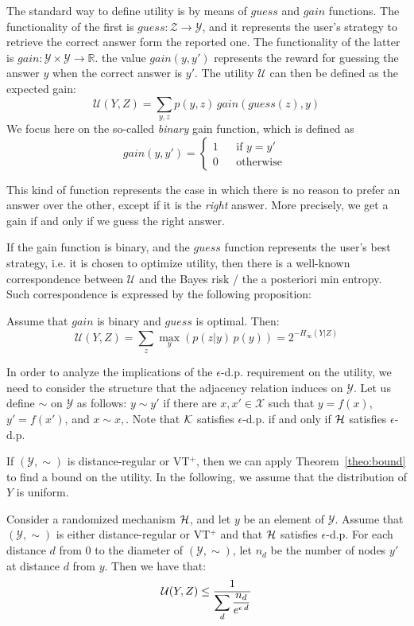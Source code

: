 \documentclass{llncs}
\newcommand{\calx}{\mathcal{X}}
\newcommand{\caly}{\mathcal{Y}}
\newcommand{\calz}{\mathcal{Z}}
\newcommand{\calu}{\mathcal{U}}
\begin{document}
The standard way to define utility  is by means of $\mathit{guess}$ and $\mathit{gain}$ functions. The functionality of the first is 
$\mathit{guess}:\calz\rightarrow \caly$, and it represents the user's strategy to retrieve the correct answer form the reported one. The functionality of the latter is $\mathit{gain}:\caly\times\caly\rightarrow \mathbb{R}$. the value $\mathit{gain}(y,y')$ represents  the reward for guessing the answer $y$ when the correct answer is $y'$. 
The utility $\calu$ can then be defined as the expected gain: 
\[
\calu(Y,Z) = \sum_{y,z} p(y,z)\,\mathit{gain}(\mathit{guess}(z),y)
\]
We focus here on the so-called  \emph{binary} gain function, which is defined as
\[
\mathit{gain}(y,y') = \left\{\begin{array}{lll} 
					1 && \mbox{if } y = y'\\[1mm]
					0 && \mbox{otherwise }
				\end{array}
				\right.
\]

This kind of function represents the case in which there is no reason to prefer an answer over the other, except if it is the \emph{right} answer. More precisely,  we get a gain if and only if we guess the right answer. 

If the gain function is binary, and the $\mathit{guess}$ function represents the user's best strategy, i.e. it is chosen to optimize  utility, then there is a well-known correspondence between  $\calu$ and the Bayes risk / the a posteriori min entropy. Such correspondence   is  expressed by the following proposition:

\begin{proposition}
Assume that $\mathit{gain}$ is binary and  $\mathit {guess}$ is optimal. Then:
\[\calu(Y,Z) = \sum_{z} \max_y (p(z|y) \, p(y)) = 2^{-H_\infty(Y|Z)}\]
\end{proposition}

In order to analyze the implications of the  $\epsilon$-d.p. requirement on the utility, we need to consider the structure that the adjacency relation induces on $\caly$. Let us define $\sim$ on $\caly$ as follows: $y\sim y'$ if there are $x,x' \in\calx$ such that $y = f(x)$, $y' = f(x')$, and $x\sim x,$. Note that $\cal K$ satisfies $\epsilon$-d.p. 
if and only if $\cal H$ satisfies $\epsilon$-d.p. 

If $(\caly,\sim)$ is distance-regular  or  VT$^+$, then we can apply Theorem~\ref{theo:bound} to find a bound on the utility. In the following, we assume that the distribution of $Y$ is uniform.
\begin{theorem}\label{theo:util}
Consider a randomized mechanism  $\cal H$, and let $y$ be an element    of $\caly$. Assume that $({\caly}, \sim)$ is either  distance-regular or VT$^+$ and that $\cal H$ satisfies $\epsilon$-d.p.
For each distance $d$  from $0$ to the diameter of $({\caly}, \sim)$,  let $n_d$ be the number of nodes $y'$ at distance $d$ from $y$. 
Then we have that:
\begin{equation}\label{eqn:util}
 {\cal U}(Y,Z) \leq   \frac{1}{\displaystyle  \sum_{d}  \frac{n_d}{e^{\epsilon \,d}}} 
\end{equation}
\end{theorem}
\end{document}
